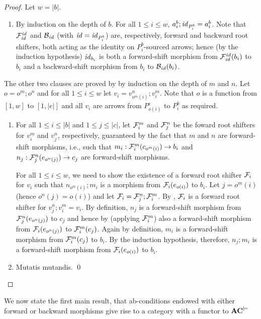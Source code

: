 \begin{proof}
Let $w=|b|$.
%
\begin{enumerate}[topsep=\smallskipamount]
\item By induction on the depth of $b$. For all $1\leq i\leq w$, $a^b_i;\mathit{id}_{P^b_i}=a^b_i$. Note that $\mathcal{F}^{\mathit{id}}_{\mathit{id}}$ and $\mathcal{B}_{\mathit{id}}$ (with $\mathit{id}=\mathit{id}_{P^b_i}$) are, respectively, forward and backward root shifters, both acting as the identity on $P^b_i$-sourced arrows; hence (by the induction hypothesis) $\mathit{id}_{b_i}$ is both a forward-shift morphism from $\mathcal{F}^{\mathit{id}}_{\mathit{id}}(b_i)$ to $b_i$ and a backward-shift morphism from $b_i$ to $\mathcal{B}_{\mathit{id}}(b_i)$.
\end{enumerate}
%
The other two clauses are proved by by induction on the depth of $m$ and $n$. Let $o=o^m;o^n$ and for all $1\leq i\leq w$ let $v_i=v^n_{o^m(i)};v^m_i$. Note that $o$ is a function from $[1,w]$ to $[1,|e|]$ and all $v_i$ are arrows from $P^e_{o(i)}$ to $P^b_i$ as required.
%
\begin{enumerate}[resume]
\item For all $1\leq i\leq |b|$ and $1\leq j\leq |c|$, let $\mathcal{F}^m_i$ and $\mathcal{F}^n_j$ be the foward root shifters for $v^m_i$ and $v^n_j$, respectively, guaranteed by the fact that $m$ and $n$ are forward-shift morphisms, i.e., such that $m_i:\mathcal{F}^m_i(c_{o^m(i)})\to b_i$ and $n_j:\mathcal{F}^n_j(e_{o^n(j)})\to c_j$ are forward-shift morphisms.

\smallskip
For all $1\leq i\leq w$, we need to show the existence of a forward root shifter $\mathcal{F}_i$ for $v_i$ such that $n_{o^m(i)};m_i$ is a morphism from $\mathcal{F}_i(e_{o(i)})$ to $b_i$. Let $j=o^m(i)$ (hence $o^n(j)=o(i)$) and let $\mathcal{F}_i=\mathcal{F}^n_j;\mathcal{F}^m_i$. By , $\mathcal{F}_i$ is a forward root shifter for $v^n_j;v^m_i=v_i$. By definition, $n_j$ is a forward-shift morphism from $\mathcal{F}^n_j(e_{o^n(j)})$ to $c_j$ and hence by  (applying $\mathcal{F}^m_i$) also a forward-shift morphism from $\mathcal{F}_i(e_{o^n(j)})$ to $\mathcal{F}^m_i(c_j)$. Again by definition, $m_i$ is a forward-shift morphism from $\mathcal{F}^m_i(c_j)$ to $b_i$. By the induction hypothesis, therefore, $n_j;m_i$ is a forward-shift morphism from $\mathcal{F}_i(e_{o(i)})$ to $b_i$.

\item Mutatis mutandis.
\qed
\end{enumerate}
\end{proof}
%
We now state the first main result, that ab-conditions endowed with either forward or backward morphisms give rise to a category with a functor to $\mathbf{AC}^{\models}$

